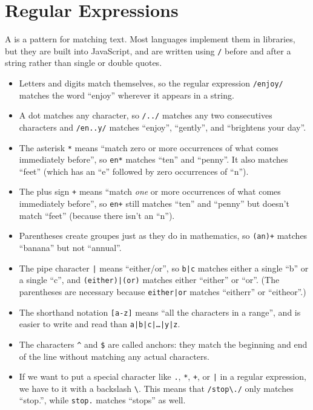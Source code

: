\chapter{Regular Expressions}\label{s:regexp}

A  is a pattern for matching text.
Most languages implement them in libraries,
but they are built into JavaScript,
and are written using \texttt{/} before and after a string rather than single or double quotes.

\begin{itemize}

\item
  Letters and digits match themselves,
  so the regular expression \texttt{/enjoy/} matches the word ``enjoy'' wherever it appears in a string.

\item
  A dot matches any character,
  so \texttt{/../} matches any two consecutives characters
  and \texttt{/en..y/} matches ``enjoy'', ``gently'', and ``brightens your day''.

\item
  The asterisk \texttt{*} means ``match zero or more occurrences of what comes immediately before'',
  so \texttt{en*} matches ``ten'' and ``penny''.
  It also matches ``feet'' (which has an ``e'' followed by zero occurrences of ``n'').

\item
  The plus sign \texttt{+} means ``match \emph{one} or more occurrences of what comes immediately before'',
  so \texttt{en+} still matches ``ten'' and ``penny'' but doesn't match ``feet''
  (because there isn't an ``n'').

\item
  Parentheses create groupes just as they do in mathematics,
  so \texttt{(an)+} matches ``banana'' but not ``annual''.

\item
  The pipe character \texttt{|} means ``either/or'',
  so \texttt{b|c} matches either a single ``b'' or a single ``c'',
  and \texttt{(either)|(or)} matches either ``either'' or ``or''.
  (The parentheses are necessary because \texttt{either|or} matches ``eitherr'' or ``eitheor''.)

\item
  The shorthand notation \texttt{[a-z]} means ``all the characters in a range'',
  and is easier to write and read than \texttt{a|b|c|{\ldots}|y|z}.

\item
  The characters \texttt{\textasciicircum} and \texttt{\$} are called anchors:
  they match the beginning and end of the line without matching any actual characters.
  
\item
  If we want to put a special character like \texttt{.}, \texttt{*}, \texttt{+}, or \texttt{|}
  in a regular expression,
  we have to  it with a backslash \texttt{\textbackslash}.
  This means that \texttt{/stop{\textbackslash}./} only matches ``stop.'',
  while \texttt{stop.} matches ``stops'' as well.
  
\end{itemize}

